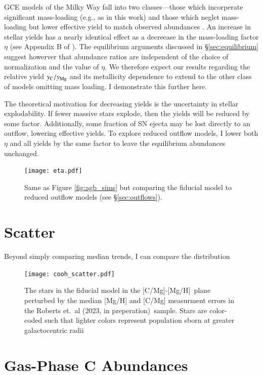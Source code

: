 \documentclass[12pt,oneside]{report}
\newcommand{\caah}{[C/Mg]-[Mg/H]}
\newcommand{\citetjack}{Roberts et.\ al (2023, in preperation)}
\begin{document}
GCE models of the Milky Way fall into two classes---those which incorperate significant mass-loading (e.g., as in this work) and those which neglet mass-loading but lower effective yield to match observed abundances \citep{MCM13, MCM14, spitoni19, spitoni20, spitoni21}.
An increase in stellar yields has a nearly identical effect as a decreease in the mass-loading factor $\eta$ (see Appendix B of \cite{james_dwarf}).
The equilibrium arguments discussed in \S\ref{sec:equilibrium} suggest howerver that abundance ratios are independent of the choice of normalization and the value of $\eta$. We therefore expect our results regarding the relative yield $y_{\rm C}/y_{\rm Mg}$ and its metallicity dependence to extend to the other class of models omitting mass loading. I demonstrate this further here.

The theoretical motivation for decreasing yields is the uncertainty in stellar explodability.
If fewer massive stars explode, then the yields will be reduced by some factor. Additionally, some fraction of SN ejecta may be lost directly to an outflow, lowering effective yields. To explore reduced outflow models, I lower both $\eta$ and all yields by the same factor to leave the equilibrium abundances unchanged. 

\begin{figure}

\texttt{[image: eta.pdf]}

\caption[Reduced-outflow models]{Same as Figure \ref{fig:agb_sims} but comparing the fiducial model to reduced outflow models (see \S \ref{sec:outflows}).}
\end{figure}


\section{Scatter}

Beyond simply comparing median trends, I can compare the distribution 

\begin{figure}
    \centering
    \texttt{[image: cooh\_scatter.pdf]}
    \caption[Scatter agreement]{The stars in the fiducial model in the \caah~plane perturbed by the median [Mg/H] and [C/Mg] measurment errors in the \citetjack~sample. Stars are color-coded such that lighter colors represent population sborn at greater galactocentric radii
    }
\end{figure}



\section{Gas-Phase C Abundances}\label{sec:gas}
\end{document}
